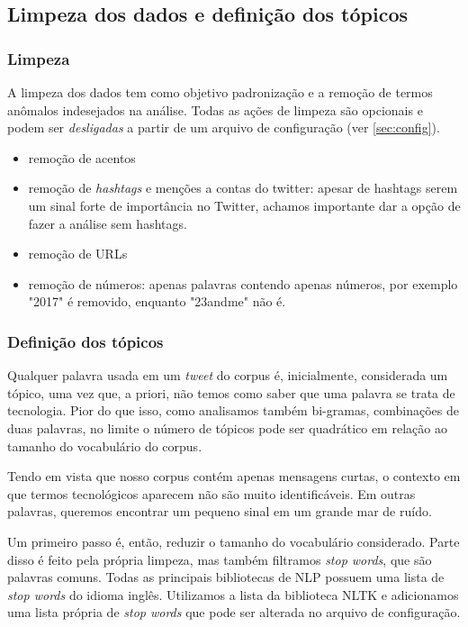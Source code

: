 \documentclass[paper=a4, fontsize=11pt]{scrartcl}
\numberwithin{equation}{section}		%
\numberwithin{figure}{section}			%
\numberwithin{table}{section}				%
\begin{document}
\subsection{Limpeza dos dados e definição dos tópicos}
\subsubsection{Limpeza}
A limpeza dos dados tem como objetivo padronização e a remoção de termos anômalos indesejados na análise. Todas as ações de limpeza são opcionais e podem ser \emph{desligadas} a partir de um arquivo de configuração (ver \ref{sec:config}).
\begin{itemize}
	\item  remoção de acentos
	\item  remoção de \emph{hashtags} e menções a contas do twitter: apesar de hashtags serem um sinal forte de importância no Twitter, achamos importante dar a opção de fazer a análise sem hashtags.
	\item  remoção de URLs
	\item  remoção de números: apenas palavras contendo apenas números, por exemplo "2017" é removido, enquanto "23andme" não é.
\end{itemize}
\subsubsection{Definição dos tópicos}
Qualquer palavra usada em um \emph{tweet} do corpus é, inicialmente, considerada um tópico, uma vez que, a priori, não temos como saber que uma palavra se trata de tecnologia. Pior do que isso, como analisamos também bi-gramas, combinações de duas palavras, no limite o número de tópicos pode ser quadrático em relação ao tamanho do vocabulário do corpus.

Tendo em vista que nosso corpus contém apenas mensagens curtas, o contexto em que termos tecnológicos aparecem não são muito identificáveis. Em outras palavras, queremos encontrar um pequeno sinal em um grande mar de ruído.

Um primeiro passo é, então, reduzir o tamanho do vocabulário considerado. Parte disso é feito pela própria limpeza, mas também filtramos \emph{stop words}, que são palavras comuns. Todas as principais bibliotecas de NLP possuem uma lista de \emph{stop words} do idioma inglês. Utilizamos a lista da biblioteca NLTK e adicionamos uma lista própria de \emph{stop words} que pode ser alterada no arquivo de configuração.
\end{document}
